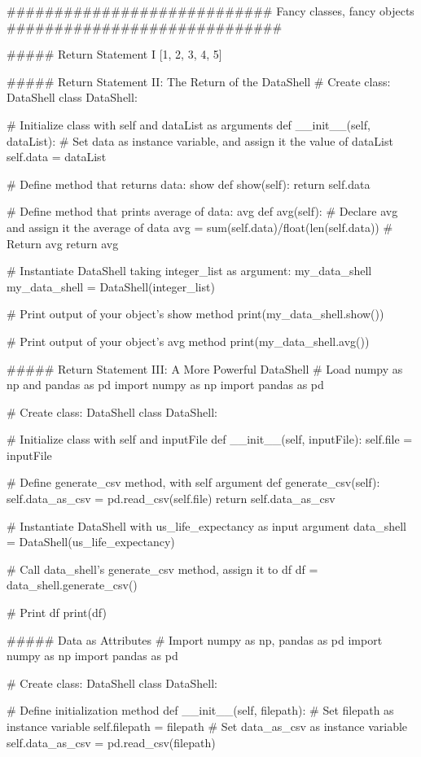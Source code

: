 ############################ Fancy classes, fancy objects #############################

##### Return Statement I
[1, 2, 3, 4, 5]


##### Return Statement II: The Return of the DataShell
# Create class: DataShell
class DataShell:
  
	# Initialize class with self and dataList as arguments
    def __init__(self, dataList):
      	# Set data as instance variable, and assign it the value of dataList
        self.data = dataList
        
	# Define method that returns data: show
    def show(self):
        return self.data
        
    # Define method that prints average of data: avg 
    def avg(self):
        # Declare avg and assign it the average of data
        avg = sum(self.data)/float(len(self.data))
        # Return avg
        return avg
        
# Instantiate DataShell taking integer_list as argument: my_data_shell
my_data_shell = DataShell(integer_list)

# Print output of your object's show method
print(my_data_shell.show())

# Print output of your object's avg method
print(my_data_shell.avg())


##### Return Statement III: A More Powerful DataShell
# Load numpy as np and pandas as pd
import numpy as np
import pandas as pd

# Create class: DataShell
class DataShell:
  
    # Initialize class with self and inputFile
    def __init__(self, inputFile):
        self.file = inputFile
        
    # Define generate_csv method, with self argument
    def generate_csv(self):
        self.data_as_csv = pd.read_csv(self.file)
        return self.data_as_csv

# Instantiate DataShell with us_life_expectancy as input argument
data_shell = DataShell(us_life_expectancy)

# Call data_shell's generate_csv method, assign it to df
df = data_shell.generate_csv()

# Print df
print(df)


##### Data as Attributes
# Import numpy as np, pandas as pd
import numpy as np
import pandas as pd

# Create class: DataShell
class DataShell:
  
    # Define initialization method
    def __init__(self, filepath):
        # Set filepath as instance variable
        self.filepath = filepath
        # Set data_as_csv as instance variable
        self.data_as_csv = pd.read_csv(filepath)

